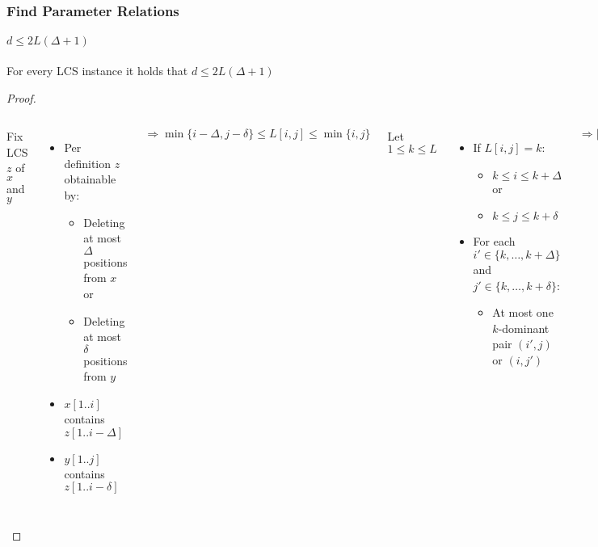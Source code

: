 \begin{frame}
	\frametitle{Find Parameter Relations}
	\framesubtitle{$d \leq 2L(\Delta + 1)$}
	
	\begin{theorem}
	For every LCS instance it holds that $d \leq 2L(\Delta + 1)$
	\end{theorem}
	
	\begin{proof}
	\color{black}
	\vspace{1ex}
	\begin{columns}[onlytextwidth]
	Fix LCS $z$ of $x$ and $y$
	\begin{itemize}
		\color{black}
		\setlength{\itemindent}{1em}
		\item Per definition $z$ obtainable by:
		\begin{itemize}
			\color{black}
			\setlength{\itemindent}{1em}
			\item Deleting at most $\Delta$ positions from $x$ or
			\item Deleting at most $\delta$ positions from $y$
		\end{itemize}
		\item $x[1..i]$ contains $z[1..i-\Delta]$
		\item $y[1..j]$ contains $z[1..i-\delta]$
	\end{itemize}
	
	\vspace{2ex}
	$\Rightarrow \min\{i-\Delta, j-\delta\} \leq L[i,j] \leq \min\{i,j\}$
	
	Let $1 \leq k \leq L$
	
	\begin{itemize}
	\color{black}
		\setlength{\itemindent}{1em}
		\item If $L[i,j] = k$:
		\begin{itemize}
			\color{black}
			\setlength{\itemindent}{1em}
			\item $k \leq i \leq k + \Delta$ or
			\item $k \leq j \leq k + \delta$
		\end{itemize}
		\item For each $i' \in \{k, \ldots, k + \Delta\}$ and $j' \in \{k, \ldots, k + \delta\}$:
		\begin{itemize}
			\color{black}
			\setlength{\itemindent}{1em}
			\item At most one $k$-dominant pair $(i',j)$ or $(i,j')$
		\end{itemize}
	\end{itemize}
	
	$\Rightarrow |D_k| \leq \Delta + \delta + 2 \leq 2(\Delta + 1)$
	
	$\Rightarrow d \leq 2L(\Delta + 1)$
	
	\end{columns}
	\end{proof}
\end{frame}